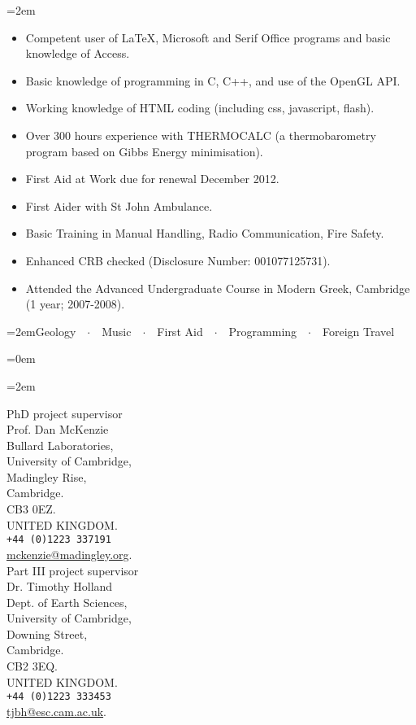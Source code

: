 \documentclass{scrartcl}	%
\newcommand{\MarginDate}[1]{\marginpar{\raggedleft\itshape\small#1}\\}
\newcommand{\Description}[1]{\hangindent=2em\footnotesize{#1}\par\normalsize}
\newcommand{\Heading}[1]{\hangindent=0em\flushleft\spacedlowsmallcaps{#1}}
\begin{document}
\begin{cv}
\Description{
\begin{itemize}
\item Competent user of \LaTeX, Microsoft and Serif Office programs and basic knowledge of Access.
\item Basic knowledge of programming in C, C++, and use of the OpenGL API.
\item Working knowledge of HTML coding (including css, javascript, flash).
\item Over 300 hours experience with THERMOCALC (a thermobarometry program based on Gibbs Energy minimisation).
\item First Aid at Work due for renewal December 2012.
\item First Aider with St John Ambulance.
\item Basic Training in Manual Handling, Radio Communication, Fire Safety.
\item Enhanced CRB checked (Disclosure Number: 001077125731).
\item Attended the Advanced Undergraduate Course in Modern Greek, Cambridge (1 year; 2007-2008).
\end{itemize}
}

\vspace{1.5em}
\Description{Geology\ \ $\cdotp$\ \ Music\ \ $\cdotp$\ \ First Aid\ \ $\cdotp$\ \  Programming\ \ $\cdotp$\ \  Foreign Travel\MarginDate{Interests}}

\vspace{1.5em}
\Heading{Referees}

\Description{
\begin{multicols}{2}{
PhD project supervisor\\
Prof. Dan McKenzie\\
Bullard Laboratories,\\
University of Cambridge,\\
Madingley Rise,\\
Cambridge.\\
CB3 0EZ.\\
UNITED KINGDOM.\\
\texttt{+44 (0)1223 337191}\\
\href{mailto:mckenzie@madingley.org}{mckenzie@madingley.org}.\\
\columnbreak
Part III project supervisor\\
Dr. Timothy Holland\\
Dept. of Earth Sciences,\\
University of Cambridge,\\
Downing Street,\\
Cambridge.\\
CB2 3EQ.\\
UNITED KINGDOM.\\
\texttt{+44 (0)1223 333453}\\
\href{mailto:tjbh@esc.cam.ac.uk}{tjbh@esc.cam.ac.uk}.\\
}
\end{multicols}
}


\end{cv}
\end{document}
